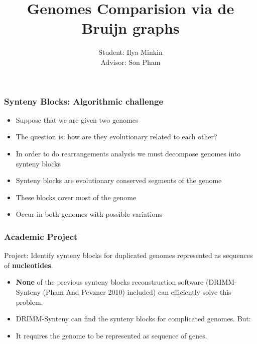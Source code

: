 \documentclass[svgnames,14pt]{beamer}
\title{Genomes Comparision via de Bruijn graphs}
\author{Student: Ilya Minkin \\ Advisor: Son Pham}
\institute{St. Petersburg Academic University}
\begin{document}
\def\braces#1{[#1]}
\newenvironment{changemargin}[2]{%
  \begin{list}{}{%
    \setlength{\topsep}{0pt}%
    \setlength{\leftmargin}{#1}%
    \setlength{\rightmargin}{#2}%
    \setlength{\listparindent}{\parindent}%
    \setlength{\itemindent}{\parindent}%
    \setlength{\parsep}{\parskip}%
  }%
  \item[]}{\end{list}}
\maketitle

\begin{frame}
\frametitle{Synteny Blocks: Algorithmic challenge}
\begin{itemize}
\item Suppose that we are given two genomes
\item The question is: how are they evolutionary related to each other?
\item In order to do rearrangements analysis we must decompose genomes into synteny blocks
\item Synteny blocks are evolutionary conserved segments of the genome
\item These blocks cover most of the genome
\item Occur in both genomes with possible variations
\end{itemize}
\end{frame}

\begin{frame}
\frametitle{Academic Project}
Project: Identify synteny blocks for duplicated genomes represented as sequences of \textbf{nucleotides}.
\begin{itemize}
\item \textbf{None} of the previous synteny blocks reconstruction software (DRIMM-Synteny (Pham And Pevzner 2010) included) can 
efficiently solve this problem. 
\item DRIMM-Synteny can find the synteny blocks for complicated genomes. But:
\pause \item It requires the genome to be represented as sequence of genes. 
\end{itemize}
\end{frame}
\end{document}

